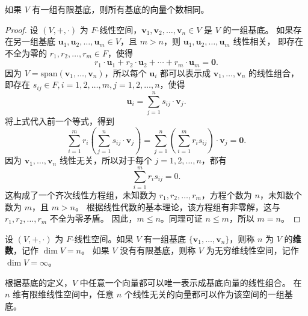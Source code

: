 \begin{proposition}
    如果 $ V $ 有一组有限基底，则所有基底的向量个数相同。
\end{proposition}
\begin{proof}
    设 $ (V,+,\cdot) $ 为 $ F $-线性空间，$ \mathbf{v}_1,\mathbf{v}_2,\ldots,\mathbf{v}_n\in V $ 是 $ V $ 的一组基底。
    如果存在另一组基底 $ \mathbf{u}_1,\mathbf{u}_2,\ldots,\mathbf{u}_m\in V $，且 $ m>n $，则 $\mathbf{u}_1,\mathbf{u}_2,\ldots,\mathbf{u}_m$ 线性相关，
    即存在不全为零的 $ r_1,r_2,\ldots,r_m\in F $，使得
    \[
        r_1\cdot \mathbf{u}_1 + r_2\cdot \mathbf{u}_2 + \cdots + r_m\cdot \mathbf{u}_m = \mathbf{0}.
    \]
    因为 $ V=\mathrm{span}(\mathbf{v}_1,\ldots,\mathbf{v}_n) $，所以每个 $\mathbf{u}_i$ 都可以表示成 $\mathbf{v}_1,\ldots,\mathbf{v}_n$ 的线性组合，
    即存在 $ s_{ij}\in F, i=1,2,\ldots,m, j=1,2,\ldots,n $，使得
    \[
        \mathbf{u}_i = \sum_{j=1}^{n} s_{ij}\cdot \mathbf{v}_j.
    \]
    将上式代入前一个等式，得到
    \[
        \sum_{i=1}^{m} r_i \left( \sum_{j=1}^{n} s_{ij}\cdot \mathbf{v}_j \right) = \sum_{j=1}^{n} \left( \sum_{i=1}^{m} r_i s_{ij} \right) \cdot \mathbf{v}_j = \mathbf{0}.
    \]
    因为 $\mathbf{v}_1,\ldots,\mathbf{v}_n$ 线性无关，所以对于每个 $ j=1,2,\ldots,n $，都有
    \[
        \sum_{i=1}^{m} r_i s_{ij} = 0.
    \]
    这构成了一个齐次线性方程组，未知数为 $ r_1,r_2,\ldots,r_m $，方程个数为 $ n $，未知数个数为 $ m $，且 $ m>n $。
    根据线性代数的基本理论，该方程组有非零解，这与 $ r_1,r_2,\ldots,r_m $ 不全为零矛盾。
    因此，$ m\leq n $。同理可证 $ n\leq m $，所以 $ m=n $。
\end{proof}
\vspace{0.5em}

\begin{definition}
    设 $ (V,+,\cdot) $ 为 $ F $-线性空间。如果 $ V $ 有一组基底 $ \{\mathbf{v}_1,\ldots,\mathbf{v}_n\} $，则称 $ n $ 为 $ V $ 的\textbf{维数}，记作 $\dim V = n$。
    如果 $ V $ 没有有限基底，则称 $ V $ 为无穷维线性空间，记作 $\dim V = \infty$。
\end{definition}

\begin{note}
    根据基底的定义，$V$ 中任意一个向量都可以唯一表示成基底向量的线性组合。
    在 $n$ 维有限维线性空间中，任意 $n$ 个线性无关的向量都可以作为该空间的一组基底。
\end{note}
\vspace{1em}


